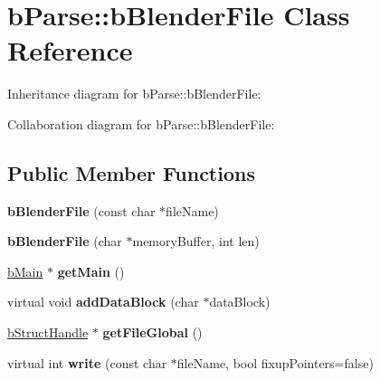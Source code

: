 \hypertarget{classb_parse_1_1b_blender_file}{\section{b\+Parse\+:\+:b\+Blender\+File Class Reference}
\label{classb_parse_1_1b_blender_file}
}


Inheritance diagram for b\+Parse\+:\+:b\+Blender\+File\+:


Collaboration diagram for b\+Parse\+:\+:b\+Blender\+File\+:
\subsection*{Public Member Functions}
\begin{DoxyCompactItemize}
\item 
\hypertarget{classb_parse_1_1b_blender_file_ad5a18435bf94df363942e8bf91ae4431}{{\bfseries b\+Blender\+File} (const char $\ast$file\+Name)}\label{classb_parse_1_1b_blender_file_ad5a18435bf94df363942e8bf91ae4431}

\item 
\hypertarget{classb_parse_1_1b_blender_file_af8a8ab12500ee61a3ec5a5155610ad4b}{{\bfseries b\+Blender\+File} (char $\ast$memory\+Buffer, int len)}\label{classb_parse_1_1b_blender_file_af8a8ab12500ee61a3ec5a5155610ad4b}

\item 
\hypertarget{classb_parse_1_1b_blender_file_af4fab724e138d84e4c2f146d1c9f68ac}{\hyperlink{classb_parse_1_1b_main}{b\+Main} $\ast$ {\bfseries get\+Main} ()}\label{classb_parse_1_1b_blender_file_af4fab724e138d84e4c2f146d1c9f68ac}

\item 
\hypertarget{classb_parse_1_1b_blender_file_adc3049fba11937a914a644d04d4ad348}{virtual void {\bfseries add\+Data\+Block} (char $\ast$data\+Block)}\label{classb_parse_1_1b_blender_file_adc3049fba11937a914a644d04d4ad348}

\item 
\hypertarget{classb_parse_1_1b_blender_file_ad107dddf1a689c9d6d448314fd319d10}{\hyperlink{structb_parse_1_1b_struct_handle}{b\+Struct\+Handle} $\ast$ {\bfseries get\+File\+Global} ()}\label{classb_parse_1_1b_blender_file_ad107dddf1a689c9d6d448314fd319d10}

\item 
\hypertarget{classb_parse_1_1b_blender_file_aac938c95d6e191a9906cf405d563a978}{virtual int {\bfseries write} (const char $\ast$file\+Name, bool fixup\+Pointers=false)}\label{classb_parse_1_1b_blender_file_aac938c95d6e191a9906cf405d563a978}


\end{DoxyCompactItemize}
